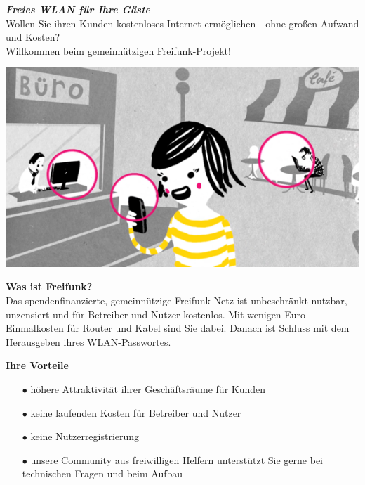\documentclass[a4paper]{article}
\begin{document}
\thispagestyle{empty}

\begin{center}
  \Huge \textit{\textbf{\textcolor{freifunkpink}{Freies WLAN für Ihre Gäste}}} \\
  \vspace{0.6cm}
  \large Wollen Sie ihren Kunden kostenloses Internet ermöglichen - ohne großen Aufwand und Kosten?\\
  Willkommen beim gemeinnützigen Freifunk-Projekt!\\
  \normalsize

  \vspace{1.25cm}
  \hspace*{-0.05 \paperwidth}\includegraphics[width=\paperwidth]{../../images/city_center}
\end{center}

\vspace{0.6cm}

\begin{Row}
  \begin{Cell}{1}
    \textbf{Was ist Freifunk?}\\
    Das spendenfinanzierte, gemeinnützige Freifunk-Netz ist unbeschränkt nutzbar, unzensiert und für Betreiber und Nutzer kostenlos. Mit wenigen Euro Einmalkosten für Router und Kabel sind Sie dabei. Danach ist Schluss mit dem Herausgeben ihres WLAN-Passwortes.
  \end{Cell}
  \begin{Cell}{1}
    \textbf{Ihre Vorteile} \vspace*{-0.18cm}
    \begin{itemize}
      \item[\textcolor{freifunkpink}{\Large$\bullet$}] höhere Attraktivität ihrer Geschäftsräume für Kunden
      \vspace*{-0.3cm}
      \item[\textcolor{freifunkpink}{\Large$\bullet$}] keine laufenden Kosten für Betreiber und Nutzer\vspace*{-0.3cm}
      \item[\textcolor{freifunkpink}{\Large$\bullet$}] keine Nutzerregistrierung
      \vspace*{-0.3cm}
      \item[\textcolor{freifunkpink}{\Large$\bullet$}] unsere Community aus freiwilligen Helfern unterstützt Sie gerne bei technischen Fragen und beim Aufbau
    \end{itemize}
  \end{Cell}
\end{Row}
\end{document}
